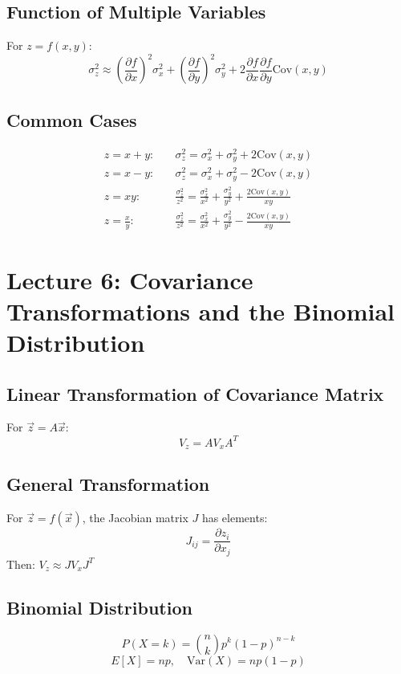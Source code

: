 \documentclass[10pt, twocolumn]{article}
\begin{document}
\subsection{Function of Multiple Variables}
For $z = f(x,y)$:
\[ \sigma_z^2 \approx \left(\frac{\partial f}{\partial x}\right)^2 \sigma_x^2 + \left(\frac{\partial f}{\partial y}\right)^2 \sigma_y^2 + 2\frac{\partial f}{\partial x}\frac{\partial f}{\partial y}\text{Cov}(x,y) \]

\subsection{Common Cases}
\begin{align}
    z = x + y: \quad       & \sigma_z^2 = \sigma_x^2 + \sigma_y^2 + 2\text{Cov}(x,y)                                                \\
    z = x - y: \quad       & \sigma_z^2 = \sigma_x^2 + \sigma_y^2 - 2\text{Cov}(x,y)                                                \\
    z = xy: \quad          & \frac{\sigma_z^2}{z^2} = \frac{\sigma_x^2}{x^2} + \frac{\sigma_y^2}{y^2} + \frac{2\text{Cov}(x,y)}{xy} \\
    z = \frac{x}{y}: \quad & \frac{\sigma_z^2}{z^2} = \frac{\sigma_x^2}{x^2} + \frac{\sigma_y^2}{y^2} - \frac{2\text{Cov}(x,y)}{xy}
\end{align}

\section{Lecture 6: Covariance Transformations and the Binomial Distribution}

\subsection{Linear Transformation of Covariance Matrix}
For $\vec{z} = A\vec{x}$:
\[ V_z = A V_x A^T \]

\subsection{General Transformation}
For $\vec{z} = f(\vec{x})$, the Jacobian matrix $J$ has elements:
\[ J_{ij} = \frac{\partial z_i}{\partial x_j} \]
Then: $V_z \approx J V_x J^T$

\subsection{Binomial Distribution}
\[ P(X = k) = \binom{n}{k} p^k (1-p)^{n-k} \]
\[ E[X] = np, \quad \text{Var}(X) = np(1-p) \]
\end{document}
